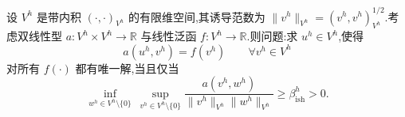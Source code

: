 \begin{lemma}\label{lem:appendix-b-15}
设 $V^h$ 是带内积 $(\cdot,\cdot)_{V^h}$ 的有限维空间,其诱导范数为
$\|v^h\|_{V^h}=(v^h,v^h)_{V^h}^{1/2}$.考虑双线性型
$a:V^h\times V^h\to\mathbb R$ 与线性泛函 $f:V^h\to\mathbb R$.则问题:求 $u^h\in V^h$,使得
\begin{equation}\label{eq:appendix-b-13}
 a(u^h,v^h)=f(v^h)\qquad \forall v^h\in V^h
\end{equation}
对所有 $f(\cdot)$ 都有唯一解,当且仅当
\begin{equation}\label{eq:appendix-b-14}
 \inf_{w^h\in V^h\setminus\{0\}}\ 
 \sup_{v^h\in V^h\setminus\{0\}}
 \frac{a(v^h,w^h)}{\|v^h\|_{V^h}\|w^h\|_{V^h}}
 \ge \beta_{\mathrm{ish}}^h>0.
\end{equation}
\end{lemma}
